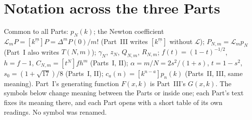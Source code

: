 \documentclass[11pt,letterpaper]{article}
\theoremstyle{remark}\newtheorem{remark}[theorem]{Remark}
\newcommand{\LL}{\mathcal L}
\newcommand{\fall}[2]{#1^{\underline{#2}}}
\begin{document}
\section*{Notation across the three Parts}\label{wdn:sec:notation}
Common to all Parts: $p_N(k)$; the Newton coefficient $\LL_mP=[\fall km]P=\Delta^mP(0)/m!$ (Part~III writes $[\fall km]$ without $\LL$); $P_{N,m}=\LL_mp_N$ (Part~I also writes $T(N,m)$); $\gamma_N$, $z_N$, $Q_{N,m}$, $R_{N,m}$; $f(t)=(1-t)^{-1/2}$, $h=f-1$, $C_{N,m}=[t^N]fh^m$ (Parts~I, II); $\alpha=m/N=2s^2/(1+s)$, $t=1-s^2$, $s_0=(1+\sqrt{17})/8$ (Parts~I, II); $c_a(n)=[k^{n-a}]p_n(k)$ (Parts~II, III, same meaning). Part~I's generating function $F(x,k)$ is Part~III's $G(x,k)$. The symbols below change meaning between the Parts or inside one; each Part's text fixes its meaning there, and each Part opens with a short table of its own readings. No symbol was renamed.
\begingroup\small
\end{document}
